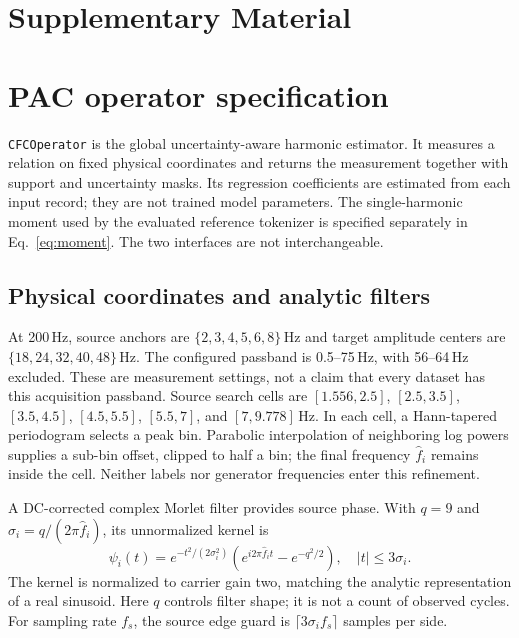 \documentclass[10pt,twocolumn,letterpaper]{article}
\begin{document}
{
\small


}
\clearpage
\appendix
\section*{Supplementary Material}

\section{PAC operator specification}
\label{app:operator}
\texttt{CFCOperator} is the global uncertainty-aware harmonic estimator.
It measures a relation on fixed physical coordinates and returns the
measurement together with support and uncertainty masks. Its regression
coefficients are estimated from each input record; they are not trained
model parameters. The single-harmonic moment used by the evaluated
reference tokenizer is specified separately in
Eq.~\ref{eq:moment}. The two interfaces are not interchangeable.

\subsection{Physical coordinates and analytic filters}
\label{app:operator-filters}
At 200\,Hz, source anchors are $\{2,3,4,5,6,8\}$\,Hz and target
amplitude centers are $\{18,24,32,40,48\}$\,Hz. The configured passband
is 0.5--75\,Hz, with 56--64\,Hz excluded. These are measurement
settings, not a claim that every dataset has this acquisition passband.
Source search cells are
$[1.556,2.5]$, $[2.5,3.5]$, $[3.5,4.5]$, $[4.5,5.5]$,
$[5.5,7]$, and $[7,9.778]$\,Hz. In each cell, a Hann-tapered
periodogram selects a peak bin. Parabolic interpolation of neighboring
log powers supplies a sub-bin offset, clipped to half a bin; the final
frequency $\hat f_i$ remains inside the cell. Neither labels nor
generator frequencies enter this refinement.

A DC-corrected complex Morlet filter provides source phase. With
$q=9$ and $\sigma_i=q/(2\pi\hat f_i)$, its unnormalized kernel is
\begin{equation}
\psi_i(t)=e^{-t^2/(2\sigma_i^2)}
 \left(e^{i2\pi\hat f_i t}-e^{-q^2/2}\right),
\quad |t|\leq3\sigma_i.
\label{eq:morlet}
\end{equation}
The kernel is normalized to carrier gain two, matching the analytic
representation of a real sinusoid. Here $q$ controls filter shape;
it is not a count of observed cycles. For sampling rate $f_s$, the
source edge guard is $\lceil3\sigma_i f_s\rceil$ samples per side.
\end{document}
